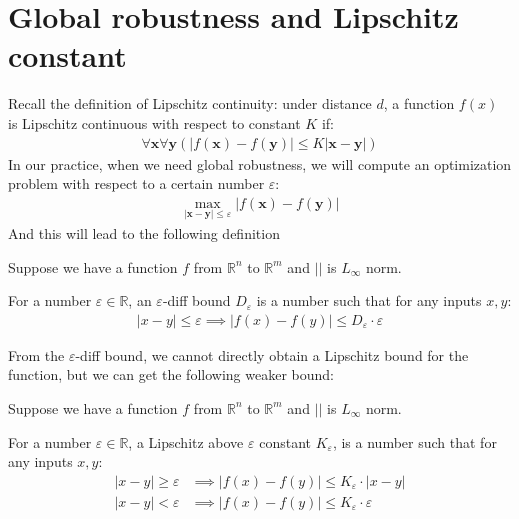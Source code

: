 	
	
	\iffalse
	
	\section{Global robustness and Lipschitz constant}
	
	
	Recall the definition of Lipschitz continuity:
	under distance $d$, a function $f(x)$ is Lipschitz continuous with respect to constant $K$ if:
	\begin{align*}
		\forall \boldsymbol{x} \forall\boldsymbol{y} (|f(\boldsymbol{x}) -f(\boldsymbol{y}) |\leq K|\boldsymbol{x}-\boldsymbol{y}|)
	\end{align*} 
	In our practice, when we need global robustness, we will compute an optimization problem with respect to a certain number $\varepsilon$:	\begin{align}\label{global_robustness}
		\max_{|\boldsymbol{x}-\boldsymbol{y}| \leq \varepsilon} |f(\boldsymbol{x}) -f(\boldsymbol{y}) |
	\end{align} And this will lead to the following definition
	
	\begin{definition}
		Suppose we have a function $f$ from $\mathbb{R}^n$ to $\mathbb{R}^m$ and $||$ is $L_\infty$ norm. 
		
		For a number $\varepsilon\in\mathbb{R}$, an $\varepsilon$-diff bound $D_\varepsilon$ is a number such that for any inputs $x,y$: \begin{align*}
			|x-y|\leq \varepsilon \implies |f(x)-f(y)| \leq D_\varepsilon \cdot \varepsilon
		\end{align*}
		
	\end{definition}
	
	From the $\varepsilon$-diff bound, we cannot directly obtain a Lipschitz bound for the function, but we can get the following weaker bound:
	
	\begin{definition}
		Suppose we have a function $f$ from $\mathbb{R}^n$ to $\mathbb{R}^m$ and $||$ is $L_\infty$ norm. 
		
		For a number $\varepsilon\in\mathbb{R}$, a Lipschitz above $\varepsilon$ constant  $K_\varepsilon$,  is a number such that for any inputs $x,y$: \begin{align*}
			|x-y|\geq \varepsilon &\implies |f(x)-f(y)| \leq K_\varepsilon \cdot |x-y|\\
			|x-y|<\varepsilon &\implies |f(x)-f(y)| \leq K_\varepsilon \cdot \varepsilon\\
		\end{align*}		
	\end{definition}
	
